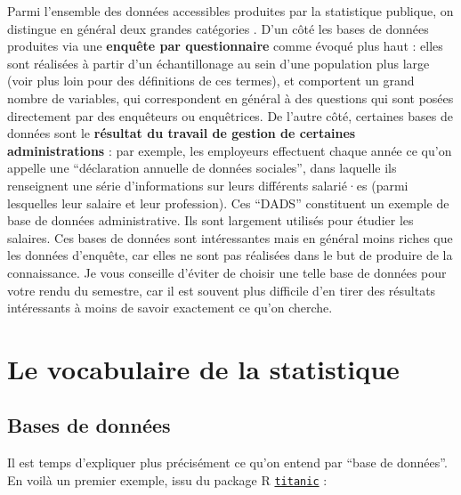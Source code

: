 \documentclass[
]{book}
\begin{document}
Parmi l'ensemble des données accessibles produites par la statistique publique, on distingue en général deux grandes catégories \citep{desrosières2005} . D'un côté les bases de données produites via une \textbf{enquête par questionnaire} comme évoqué plus haut : elles sont réalisées à partir d'un échantillonage au sein d'une population plus large (voir plus loin pour des définitions de ces termes), et comportent un grand nombre de variables, qui correspondent en général à des questions qui sont posées directement par des enquêteurs ou enquêtrices. De l'autre côté, certaines bases de données sont le \textbf{résultat du travail de gestion de certaines administrations} : par exemple, les employeurs effectuent chaque année ce qu'on appelle une ``déclaration annuelle de données sociales'', dans laquelle ils renseignent une série d'informations sur leurs différents salarié·es (parmi lesquelles leur salaire et leur profession). Ces ``DADS'' constituent un exemple de base de données administrative. Ils sont largement utilisés pour étudier les salaires. Ces bases de données sont intéressantes mais en général moins riches que les données d'enquête, car elles ne sont pas réalisées dans le but de produire de la connaissance. Je vous conseille d'éviter de choisir une telle base de données pour votre rendu du semestre, car il est souvent plus difficile d'en tirer des résultats intéressants à moins de savoir exactement ce qu'on cherche.

\hypertarget{le-vocabulaire-de-la-statistique}{%
\section{Le vocabulaire de la statistique}\label{le-vocabulaire-de-la-statistique}}

\hypertarget{bases-de-donnuxe9es}{%
\subsection{Bases de données}\label{bases-de-donnuxe9es}}

Il est temps d'expliquer plus précisément ce qu'on entend par ``base de données''. En voilà un premier exemple, issu du package R \href{https://cran.r-project.org/web/packages/titanic/titanic.pdf}{\texttt{titanic}} :
\end{document}
